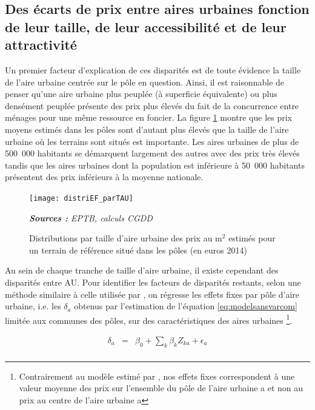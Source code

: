 \documentclass[10.5pt,a4paper]{article}
\begin{document}
{\subsection{Des écarts de prix entre aires urbaines fonction de leur taille, de leur accessibilité et de leur attractivité}

Un premier facteur d'explication de ces disparités est de toute évidence la taille de l'aire urbaine centrée sur le pôle en question. Ainsi, il est raisonnable de penser qu'une aire urbaine plus peuplée (à superficie équivalente) ou plus densément peuplée présente des prix plus élevés du fait de la concurrence entre ménages pour une même ressource en foncier. La figure \ref{distriTAU} montre que les prix moyens estimés dans les pôles sont d’autant plus élevés que la taille de l’aire urbaine où les terrains sont situés est importante. Les aires urbaines de plus de 500~000  habitants se démarquent largement des autres avec des prix très élevés tandis que les aires urbaines dont la population est inférieure à 50~000 habitants présentent des prix inférieurs à la moyenne nationale.\par  

\begin{figure}[!h]%
\begin{center}
\caption{Distributions  par taille d'aire urbaine des prix au m$^2$ estimés pour un terrain de référence situé dans les pôles (en euros 2014)\label{distriTAU}}
\texttt{[image: distriEF\_parTAU]}
\end{center}

\scriptsize \textit{\textbf{Sources :} EPTB, calculs CGDD}
\end{figure}

Au sein de chaque tranche de taille d'aire urbaine, il existe cependant des disparités entre AU. Pour identifier les facteurs de disparités restants, selon une méthode similaire à celle utilisée par \cite{Combes_etal11}, on régresse les effets fixes par pôle d'aire urbaine, i.e. les $\delta_a$ obtenus par l'estimation de l'équation \ref{eq:modelsansvarcom} limitée aux communes des pôles, sur des caractéristiques des aires urbaines \footnote{Contrairement au modèle estimé par \cite{Combes_etal11}, nos effets fixes correspondent à une valeur moyenne des prix sur l'ensemble du pôle de l'aire urbaine a et non au prix au centre de l'aire urbaine a}. \par   

\begin{eqnarray*}
\delta_{a} & =& \beta_0 + \sum_k \beta_k Z_{ka} + \epsilon_{a} \\
\label{eq:modelEFpole}
\end{eqnarray*}

}
\end{document}
